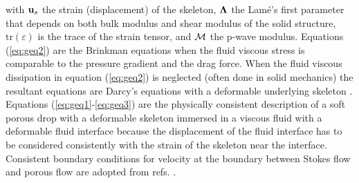 \documentclass[11pt]{article}
\begin{document}
with ${\bf u}_s$ the strain (displacement) of the skeleton, 
${\bf \Lambda}$ the Lam\'e's first parameter that depends on both bulk modulus and shear modulus of the solid structure, $\mbox{tr}(\varepsilon)$
is the trace of the strain tensor, 
and ${\cal M}$ the p-wave modulus. 
Equations (\ref{eq:geq2}) are the Brinkman equations when the fluid viscous stress is comparable to the pressure gradient and the drag force.
When the fluid viscous dissipation in equation (\ref{eq:geq2}) is neglected (often done in solid mechanics) the resultant equations are Darcy's equations with a
deformable underlying skeleton \cite{MacMinn2016_PRApplied}. Equations (\ref{eq:geq1}-\ref{eq:geq3}) are the physically consistent description of a soft
porous drop with a deformable skeleton immersed in a viscous fluid with a deformable fluid interface because the displacement of the fluid interface has to be considered consistently
with the strain of the skeleton near the interface. Consistent boundary conditions for velocity at the boundary between Stokes flow and porous flow are adopted from refs.
\cite{Angot2017_PRE,MacMinn2016_PRApplied}.
\end{document}

